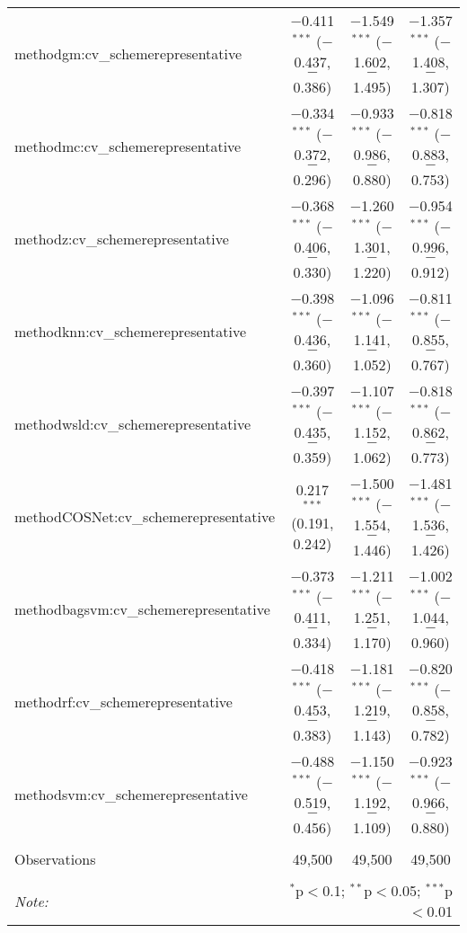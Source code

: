 \begin{table}[!htbp]
\begin{tabular}{@{\extracolsep{5pt}}lccc}
  methodgm:cv\_schemerepresentative & $-$0.411$^{***}$ ($-$0.437, $-$0.386) & $-$1.549$^{***}$ ($-$1.602, $-$1.495) & $-$1.357$^{***}$ ($-$1.408, $-$1.307) \\ 
  methodmc:cv\_schemerepresentative & $-$0.334$^{***}$ ($-$0.372, $-$0.296) & $-$0.933$^{***}$ ($-$0.986, $-$0.880) & $-$0.818$^{***}$ ($-$0.883, $-$0.753) \\ 
  methodz:cv\_schemerepresentative & $-$0.368$^{***}$ ($-$0.406, $-$0.330) & $-$1.260$^{***}$ ($-$1.301, $-$1.220) & $-$0.954$^{***}$ ($-$0.996, $-$0.912) \\ 
  methodknn:cv\_schemerepresentative & $-$0.398$^{***}$ ($-$0.436, $-$0.360) & $-$1.096$^{***}$ ($-$1.141, $-$1.052) & $-$0.811$^{***}$ ($-$0.855, $-$0.767) \\ 
  methodwsld:cv\_schemerepresentative & $-$0.397$^{***}$ ($-$0.435, $-$0.359) & $-$1.107$^{***}$ ($-$1.152, $-$1.062) & $-$0.818$^{***}$ ($-$0.862, $-$0.773) \\ 
  methodCOSNet:cv\_schemerepresentative & 0.217$^{***}$ (0.191, 0.242) & $-$1.500$^{***}$ ($-$1.554, $-$1.446) & $-$1.481$^{***}$ ($-$1.536, $-$1.426) \\ 
  methodbagsvm:cv\_schemerepresentative & $-$0.373$^{***}$ ($-$0.411, $-$0.334) & $-$1.211$^{***}$ ($-$1.251, $-$1.170) & $-$1.002$^{***}$ ($-$1.044, $-$0.960) \\ 
  methodrf:cv\_schemerepresentative & $-$0.418$^{***}$ ($-$0.453, $-$0.383) & $-$1.181$^{***}$ ($-$1.219, $-$1.143) & $-$0.820$^{***}$ ($-$0.858, $-$0.782) \\ 
  methodsvm:cv\_schemerepresentative & $-$0.488$^{***}$ ($-$0.519, $-$0.456) & $-$1.150$^{***}$ ($-$1.192, $-$1.109) & $-$0.923$^{***}$ ($-$0.966, $-$0.880) \\ 
 \hline \\[-1.8ex] 
Observations & 49,500 & 49,500 & 49,500 \\ 
\hline 
\hline \\[-1.8ex] 
\textit{Note:}  & \multicolumn{3}{r}{$^{*}$p$<$0.1; $^{**}$p$<$0.05; $^{***}$p$<$0.01} \\ 
\end{tabular} 
\end{table} 
